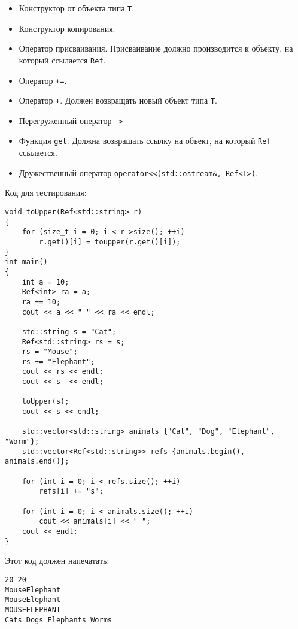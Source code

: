\documentclass{article}
\begin{document}
\begin{itemize}
\item Конструктор от объекта типа \texttt{T}.
\item Конструктор копирования.
\item Оператор присваивания. Присваивание должно производится к объекту, на который ссылается \texttt{Ref}.
\item Оператор \texttt{+=}.
\item Оператор \texttt{+}. Должен возвращать новый объект типа \texttt{T}.
\item Перегруженный оператор \texttt{->}
\item Функция \texttt{get}. Должна возвращать ссылку на объект, на который \texttt{Ref} ссылается.
\item Дружественный оператор \texttt{operator<<(std::ostream\&, Ref<T>)}. 
\end{itemize}

Код для тестирования:
\begin{lstlisting}
void toUpper(Ref<std::string> r)
{
    for (size_t i = 0; i < r->size(); ++i)
        r.get()[i] = toupper(r.get()[i]);
}
int main()
{
    int a = 10;
    Ref<int> ra = a;
    ra += 10;
    cout << a << " " << ra << endl;

    std::string s = "Cat";
    Ref<std::string> rs = s;
    rs = "Mouse";
    rs += "Elephant";
    cout << rs << endl;
    cout << s  << endl;
    
    toUpper(s);
    cout << s << endl;

    std::vector<std::string> animals {"Cat", "Dog", "Elephant", "Worm"};
    std::vector<Ref<std::string>> refs {animals.begin(), animals.end()};

    for (int i = 0; i < refs.size(); ++i)
        refs[i] += "s";

    for (int i = 0; i < animals.size(); ++i)
        cout << animals[i] << " ";
    cout << endl;
}
\end{lstlisting}

\newpage
Этот код должен напечатать:
\begin{verbatim}
20 20
MouseElephant
MouseElephant
MOUSEELEPHANT
Cats Dogs Elephants Worms 
\end{verbatim}
\end{document}
